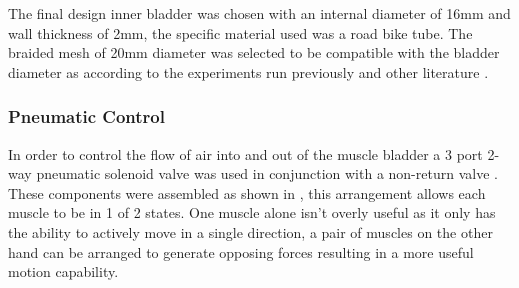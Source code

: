 \documentclass[11pt,a4paper]{article}
\begin{document}
The final design inner bladder was chosen with an internal diameter of 16mm and wall thickness of 2mm, the specific material used was a road bike tube. The braided mesh of 20mm diameter was selected to be compatible with the bladder diameter as according to the experiments run previously and other literature \cite{andrikopoulos_nikolakopoulos_2017}.

\subsubsection{Pneumatic Control}
\label{subsubsection:pneumatic_control}

In order to control the flow of air into and out of the muscle bladder a 3 port 2-way pneumatic solenoid valve was used in conjunction with a non-return valve \cite{airsky_pneumatic}. These components were assembled as shown in , this arrangement allows each muscle to be in 1 of 2 states. One muscle alone isn't overly useful as it only has the ability to actively move in a single direction, a pair of muscles on the other hand can be arranged to generate opposing forces resulting in a more useful motion capability. \newline
\end{document}
